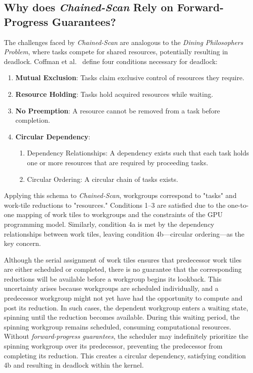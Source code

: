 \documentclass[sigconf]{acmart}
\begin{document}
\subsection{Why does \emph{Chained-Scan} Rely on Forward-Progress Guarantees?}
The challenges faced by \emph{Chained-Scan} are analogous to the \emph{Dining Philosophers Problem}, where tasks compete for shared resources, potentially resulting in deadlock. Coffman et al.~\cite{10.1145/356586.356588} define four conditions necessary for deadlock:
\begin{enumerate}
  \item \textbf{Mutual Exclusion}: Tasks claim exclusive control of resources they require.
  \item \textbf{Resource Holding}: Tasks hold acquired resources while waiting.
  \item \textbf{No Preemption}: A resource cannot be removed from a task before completion.
  \item \textbf{Circular Dependency}:
  \begin{enumerate}
    \item Dependency Relationships: A dependency exists such that each task holds one or more resources that are required by proceeding tasks.
    \item Circular Ordering: A circular chain of tasks exists.
  \end{enumerate}
\end{enumerate}
Applying this schema to \emph{Chained-Scan}, workgroups correspond to "tasks" and work-tile reductions to "resources." Conditions 1–3 are satisfied due to the one-to-one mapping of work tiles to workgroups and the constraints of the GPU programming model. Similarly, condition 4a is met by the dependency relationships between work tiles, leaving condition 4b---circular ordering---as the key concern.

Although the serial assignment of work tiles ensures that predecessor work tiles are either scheduled or completed, there is no guarantee that the corresponding reductions will be available before a workgroup begins its lookback. This uncertainty arises because workgroups are scheduled individually, and a predecessor workgroup might not yet have had the opportunity to compute and post its reduction. In such cases, the dependent workgroup enters a waiting state, spinning until the reduction becomes available. During this waiting period, the spinning workgroup remains scheduled, consuming computational resources. Without \emph{forward-progress guarantees}, the scheduler may indefinitely prioritize the spinning workgroup over its predecessor, preventing the predecessor from completing its reduction. This creates a circular dependency, satisfying condition 4b and resulting in deadlock within the kernel.
\end{document}
